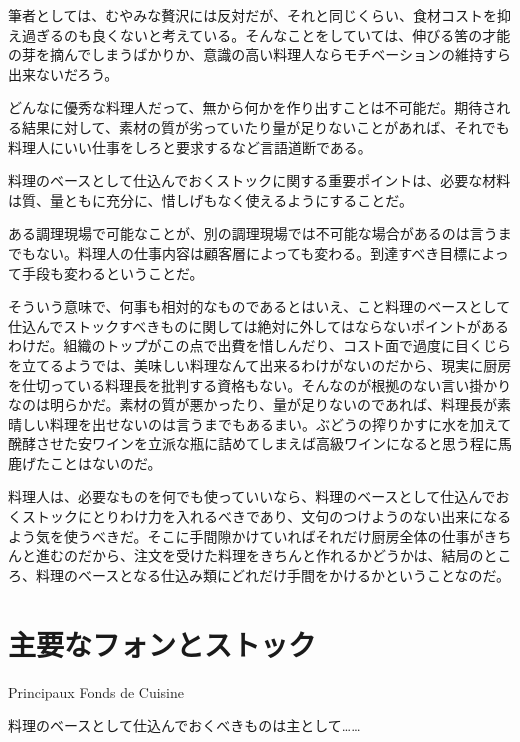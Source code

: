 \begin{main}
筆者としては、むやみな贅沢には反対だが、それと同じくらい、食材コストを抑え過ぎるのも良くないと考えている。そんなことをしていては、伸びる筈の才能の芽を摘んでしまうばかりか、意識の高い料理人ならモチベーションの維持すら出来ないだろう。

どんなに優秀な料理人だって、無から何かを作り出すことは不可能だ。期待される結果に対して、素材の質が劣っていたり量が足りないことがあれば、それでも料理人にいい仕事をしろと要求するなど言語道断である。

料理のベースとして仕込んでおくストックに関する重要ポイントは、必要な材料は質、量ともに充分に、惜しげもなく使えるようにすることだ。

ある調理現場で可能なことが、別の調理現場では不可能な場合があるのは言うまでもない。料理人の仕事内容は顧客層によっても変わる。到達すべき目標によって手段も変わるということだ。

そういう意味で、何事も相対的なものであるとはいえ、こと料理のベースとして仕込んでストックすべきものに関しては絶対に外してはならないポイントがあるわけだ。組織のトップがこの点で出費を惜しんだり、コスト面で過度に目くじらを立てるようでは、美味しい料理なんて出来るわけがないのだから、現実に厨房を仕切っている料理長を批判する資格もない。そんなのが根拠のない言い掛かりなのは明らかだ。素材の質が悪かったり、量が足りないのであれば、料理長が素晴しい料理を出せないのは言うまでもあるまい。ぶどうの搾りかすに水を加えて醗酵させた安ワインを立派な瓶に詰めてしまえば高級ワインになると思う程に馬鹿げたことはないのだ。

料理人は、必要なものを何でも使っていいなら、料理のベースとして仕込んでおくストックにとりわけ力を入れるべきであり、文句のつけようのない出来になるよう気を使うべきだ。そこに手間隙かけていればそれだけ厨房全体の仕事がきちんと進むのだから、注文を受けた料理をきちんと作れるかどうかは、結局のところ、料理のベースとなる仕込み類にどれだけ手間をかけるかということなのだ。

\hypertarget{principaux-fonds-de-cuisine}{%
\section{主要なフォンとストック}\label{principaux-fonds-de-cuisine}}

\begin{frsecenv}

Principaux Fonds de Cuisine

\end{frsecenv}

料理のベースとして仕込んでおくべきものは主として\ldots{}\ldots{}


\end{main}
